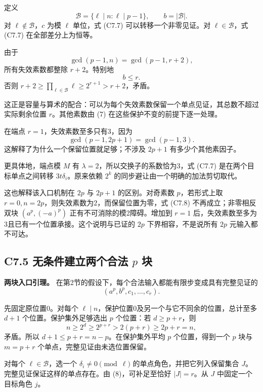 {定义} \[
\mathcal B=\{\ell\mid n:\ell\mid p-1\},\qquad b=|\mathcal B|.
\] {对} \(\ell\notin\mathcal B\){，}\(c\) {为模} \(\ell\) {单位，式} {(C7.7)} {可以转移一个非零见证。对} \(\ell\in\mathcal B\){，式} {(C7.7)} {在全部差分上为恒等。}

{由于} \[
\gcd(p-1,n)=\gcd(p-1,r+2),
\] {所有失效素数都整除} \(r+2\){。特别地} \[
\boxed{b\le r.}\tag{C7.8}
\] {否则} \(r+2\ge\prod_{\ell\in\mathcal B}\ell\ge2^{r+1}>r+2\){，矛盾。}

{这正是容量与算术的配合：可以为每个失效素数保留一个单点见证，其总数不超过实际剩余位置} \(r\){。其他素数由} {(7)} {在这些保护不变的前提下逐一处理。}

{在端点} \(r=1\){，失效素数至多只有3，因为} \[
\gcd(p-1,2p+1)=\gcd(p-1,3).
\] {这解释了为什么一个保留位置就足够；不涉及} \(2p+1\) {有多少个其他素因子。}

{更具体地，端点模} \(M\) {有} \(\lambda=2\){，所以交换子的系数恰为3，式} {(C7.7)} {是在两个目标单点之间转移} \(3t\delta_i\){。原来依赖} \(2^k\) {的同步避让由一个明确的加法剪切取代。}

{这也解释该入口机制在} \(2p\) {与} \(2p+1\) {的区别。对奇素数} \(p\){，若形式上取} \(r=0,n=2p\){，则失效素数为2，而保留位置为零，式} {(C7.8)} {不再成立；非零相反双块} \((a^p,(-a)^p)\) {正有不可消除的模2障碍。增加到} \(r=1\) {后，失效素数至多为3且已有一个位置承接。这个说明与已证的} \(2p\) {下界相容，不是说所有} \(2p\) {元输入都不可达。}

\subsection*{\texorpdfstring{{C7.5} {无条件建立两个合法} \(p\) {块}}{C7.5 无条件建立两个合法 p 块}}\label{C7-h43}

\textbf{{两块入口引理。}} {在第2节的假设下，每个合法输入都能有限步变成具有完整见证的} \[
(a^p,b^p,c_1,\ldots,c_r).
\tag{C7.9}
\]

{先固定原位置0。对每个} \(\ell\mid n\){，保护位置0及另一个与它不同余的位置，总计至多} \(d+1\) {个位置。保护集外足够选出} \(p\) {个位置：若} \(d\ge p+r\){，则} \[
n\ge2^d\ge2^{p+r}>2(p+r)\ge2p+r=n,
\] {矛盾。所以} \(d+1\le p+r=n-p\){。在保护集外平均} \(p\) {个位置，得到一个} \(p\) {块与} \(m=p+r\) {个单点，完整见证由未选位置保留。}

{对每个} \(\ell\in\mathcal B\){，选一个} \(\delta_i\ne0\pmod\ell\) {的单点角色，并把它列入保留集合} \(J\){。完整见证保证这样的单点存在。由} {(8)，可补足至恰好} \(|J|=r\){。从} \(J\) {中固定一个目标角色} \(j\){。}

